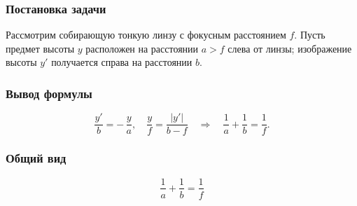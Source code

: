 \documentclass[12pt, a4paper]{article}
\begin{document}
\subsubsection*{Постановка задачи}

Рассмотрим собирающую тонкую линзу с фокусным расстоянием $f$. Пусть предмет высоты $y$ расположен на расстоянии $a>f$ слева от линзы; изображение высоты $y'$ получается справа на расстоянии $b$.

\subsubsection*{Вывод формулы}

\[
\frac{y'}{b}=-\,\frac{y}{a}, \quad \frac{y}{f}=\frac{|y'|}{b-f}
\quad\Longrightarrow\quad
\frac{1}{a}+\frac{1}{b}=\frac{1}{f}.
\]

\subsubsection*{Общий вид}

\[
\boxed{\ \frac{1}{a}+\frac{1}{b}=\frac{1}{f}\ }
\]
\end{document}
